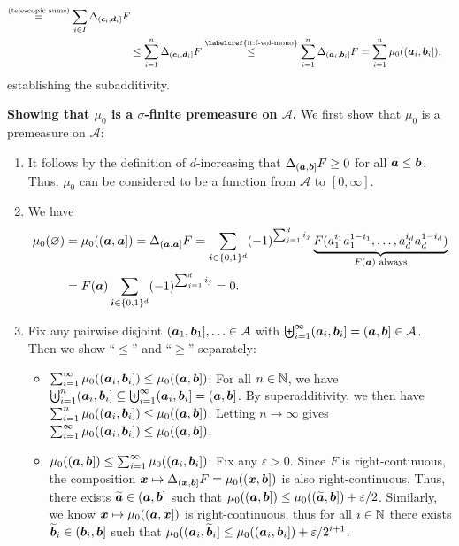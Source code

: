 \begin{enumerate}
\begin{pf}
\begin{itemize}
\begin{align*}
\overset{\text{(telescopic sums)}}{=}\sum_{i\in I}^{}\Delta_{(\vect{c}_i,\vect{d}_i]}F \\
&\le\sum_{i=1}^{n}\Delta_{(\vect{c}_i,\vect{d}_i]}F
\overset{\text{\labelcref{it:f-vol-mono}}}{\le}\sum_{i=1}^{n}\Delta_{(\vect{a}_i,\vect{b}_i]}F
=\sum_{i=1}^{n}\mu_0((\vect{a}_i,\vect{b}_i]),
\end{align*}
establishing the subadditivity.
\end{itemize}
\textbf{Showing that \(\mu_0\) is a \(\sigma\)-finite premeasure on
\(\mathcal{A}\).}
We first show that \(\mu_0\) is a premeasure on \(\mathcal{A}\):
\begin{enumerate}[label={(\arabic*)}]
\item It follows by the definition of \(d\)-increasing that
\(\Delta_{(\bm{a},\bm{b}]}F\ge 0\) for all \(\bm{a}\le\bm{b}\).
Thus, \(\mu_0\) can be considered to be a function from \(\mathcal{A}\) to \([0,\infty]\).
\item We have
\begin{align*}
\mu_0(\varnothing)&=\mu_0((\bm{a},\bm{a}])
=\Delta_{(\bm{a},\bm{a}]}F=\sum_{\bm{i}\in\{0,1\}^{d}}^{}(-1)^{\sum_{j=1}^{d}i_j}
\underbrace{F(a_1^{i_1}a_1^{1-i_1},\dotsc,a_d^{i_d}a_d^{1-i_d})}_{\text{\(F(\bm{a})\) always}} \\
&=F(\bm{a})\sum_{\bm{i}\in\{0,1\}^{d}}^{}(-1)^{\sum_{j=1}^{d}i_j}=0.
\end{align*}
\item Fix any pairwise disjoint \((\bm{a}_1,\bm{b}_1]
,\dotsc\in\mathcal{A}\) with
\(\biguplus_{i=1}^{\infty}(\bm{a}_i,\bm{b}_i]=
(\bm{a},\bm{b}]\in\mathcal{A}\). Then we show ``\(\leq\)'' and ``\(\geq\)''
separately:
\begin{itemize}
\item \underline{\(\sum_{i=1}^{\infty}\mu_0((\bm{a}_i,\bm{b}_i])\le\mu_0((\bm{a},\bm{b}])\)}:
For all \(n\in\mathbb{N}\), we have
\(\biguplus_{i=1}^{n}(\bm{a}_i,\bm{b}_i]\subseteq
\biguplus_{i=1}^{\infty}(\bm{a}_i,\bm{b}_i]=(\bm{a},\bm{b}]\). By
superadditivity, we then have
\(\sum_{i=1}^{n}\mu_0((\bm{a}_i,\bm{b}_i])\le\mu_0((\bm{a},\bm{b}])\).
Letting \(n\to\infty\) gives
\(\sum_{i=1}^{\infty}\mu_0((\bm{a}_i,\bm{b}_i])\le\mu_0((\bm{a},\bm{b}])\).

\item \underline{\(\mu_0((\bm{a},\bm{b}])\le\sum_{i=1}^{\infty}\mu_0((\bm{a}_i,\bm{b}_i])\)}:
Fix any \(\varepsilon>0\). Since \(F\) is right-continuous, the composition
\(\bm{x}\mapsto \Delta_{(\bm{x},\bm{b}]}F=\mu_0((\bm{x},\bm{b}])\) is
also right-continuous. Thus, there exists
\(\widetilde{\bm{a}}\in(\bm{a},\bm{b}]\) such that
\(\mu_0((\bm{a},\bm{b}])\le\mu_0((\widetilde{\bm{a}},\bm{b}])+\varepsilon/2\).
Similarly, we know \(\bm{x}\mapsto\mu_0((\bm{a},\bm{x}])\) is
right-continuous, thus for all \(i\in\mathbb{N}\) there exists
\(\widetilde{\bm{b}}_i\in(\bm{b}_i,\bm{b}]\) such that
\(\mu_0((\bm{a}_i,\widetilde{\bm{b}}_i]
\le\mu_0((\bm{a}_i,\bm{b}_i])+\varepsilon/2^{i+1}\).


\end{itemize}
\end{enumerate}
\end{pf}
\end{enumerate}
